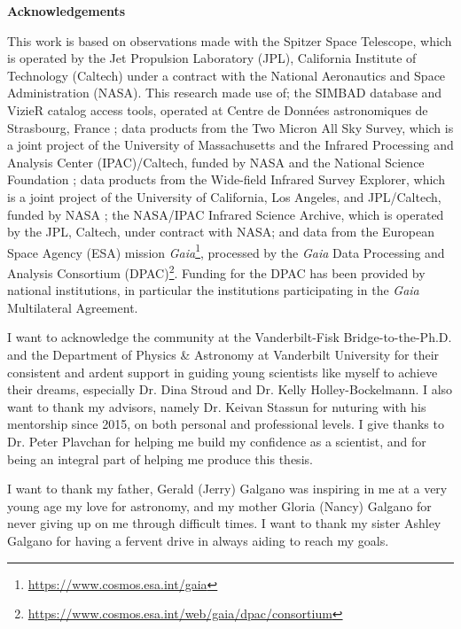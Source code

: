 {}

\noindent \textbf{Acknowledgements}


This work is based on observations made with the Spitzer Space Telescope, which is operated by the Jet Propulsion Laboratory (JPL), California Institute of Technology (Caltech) under a contract with the National Aeronautics and Space Administration (NASA). This research made use of; the SIMBAD database and VizieR catalog access tools, operated at Centre de Donn\'ees astronomiques de Strasbourg, France \citep{VIZIER}; data products from the Two Micron All Sky Survey, which is a joint project of the University of Massachusetts and the Infrared Processing and Analysis Center (IPAC)/Caltech, funded by NASA and the National Science Foundation \citep{2MASS}; data products from the Wide-field Infrared Survey Explorer, which is a joint project of the University of California, Los Angeles, and JPL/Caltech, funded by NASA \citep{WISE}; the NASA/IPAC Infrared Science Archive, which is operated by the JPL, Caltech, under contract with NASA; and data from the European Space Agency (ESA) mission {\it Gaia}\footnote{\url{https://www.cosmos.esa.int/gaia}}, processed by the {\it Gaia} Data Processing and Analysis Consortium (DPAC)\footnote{ \url{https://www.cosmos.esa.int/web/gaia/dpac/consortium}}. Funding for the DPAC has been provided by national institutions, in particular the institutions participating in the {\it Gaia} Multilateral Agreement.

I want to acknowledge the community at the Vanderbilt-Fisk Bridge-to-the-Ph.D. and the Department of Physics \& Astronomy at Vanderbilt University for their consistent and ardent support in guiding young scientists like myself to achieve their dreams, especially Dr. Dina Stroud and Dr. Kelly Holley-Bockelmann.  I also want to thank my advisors, namely Dr. Keivan Stassun for nuturing with his mentorship since 2015, on both personal and professional levels. I give thanks to Dr. Peter Plavchan for helping me build my confidence as a scientist, and for being an integral part of helping me produce this thesis.

I want to thank my father, Gerald (Jerry) Galgano was inspiring in me at a very young age my love for astronomy, and my mother Gloria (Nancy) Galgano for never giving up on me through difficult times. I want to thank my sister Ashley Galgano for having a fervent drive in always aiding to reach my goals.